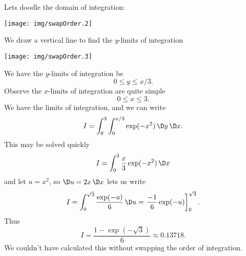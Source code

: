 Lets doodle the domain of integration:
\begin{center}
  \texttt{[image: img/swapOrder.2]}
\end{center}
We draw a vertical line to find the $y$-limits of integration
\begin{center}
  \texttt{[image: img/swapOrder.3]}
\end{center}
We have the $y$-limits of integration be
\begin{equation}
0\leq y\leq x/3.
\end{equation}
Observe the $x$-limits of integration are quite simple
\begin{equation}
0\leq x\leq 3.
\end{equation}
We have the limits of integration, and we can write
\begin{equation}
I=\int^{3}_{0}\int^{x/3}_{0}\exp(-x^{2})\,\D y\,\D x.
\end{equation}
This may be solved quickly
\begin{equation}
I = \int^{3}_{0}\frac{x}{3}\exp(-x^{2})\,\D x
\end{equation}
and let $u=x^{2}$, so $\D u=2x\,\D x$ lets us write
\begin{equation}
I=\int^{\sqrt{3}}_{0}\frac{\exp(-u)}{6}\,\D u = \left.\frac{-1}{6}\exp(-u)\right]^{\sqrt{3}}_{0}.
\end{equation}
Thus
\begin{equation}
I = \frac{1-\exp(-\sqrt{3})}{6} \approx 0.13718.
\end{equation}
We couldn't have calculated this without swapping the order of integration.
